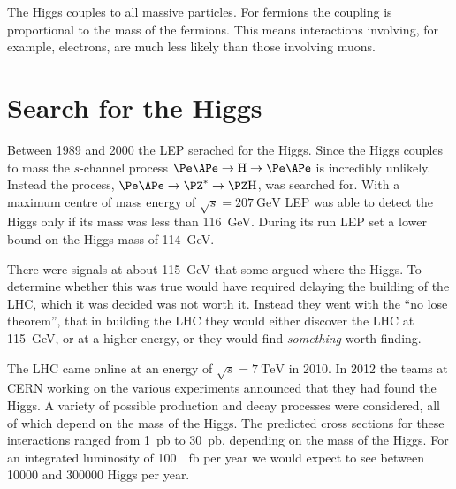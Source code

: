 \documentclass[fleqn]{NotesClass}
\newcommand{\PH}{\ensuremath{\mathrm{H}}}
\begin{document}
    The Higgs couples to all massive particles.
    For fermions the coupling is proportional to the mass of the fermions.
    This means interactions involving, for example, electrons, are much less likely than those involving muons.
    
    \section{Search for the Higgs}
    Between 1989 and 2000 the LEP serached for the Higgs.
    Since the Higgs couples to mass the \(s\)-channel process \(\Pe\APe \to \PH \to \Pe\APe\) is incredibly unlikely.
    Instead the  process, \(\Pe\APe \to \PZ^* \to \PZ\PH\), was searched for.
    With a maximum centre of mass energy of \(\sqrt{s} = \qty{207}{\giga\electronvolt}\) LEP was able to detect the Higgs only if its mass was less than \qty{116}{\giga\electronvolt}.
    During its run LEP set a lower bound on the Higgs mass of \qty{114}{\giga\electronvolt}.
    
    There were signals at about \qty{115}{\giga\electronvolt} that some argued where the Higgs.
    To determine whether this was true would have required delaying the building of the LHC, which it was decided was not worth it.
    Instead they went with the \enquote{no lose theorem}, that in building the LHC they would either discover the LHC at \qty{115}{\giga\electronvolt}, or at a higher energy, or they would find \emph{something} worth finding.
    
    The LHC came online at an energy of \(\sqrt{s} = \qty{7}{\tera\electronvolt}\) in 2010.
    In 2012 the teams at CERN working on the various experiments announced that they had found the Higgs.
    A variety of possible production and decay processes were considered, all of which depend on the mass of the Higgs.
    The predicted cross sections for these interactions ranged from \qty{1}{\pico\barn} to \qty{30}{\pico\barn}, depending on the mass of the Higgs.
    For an integrated luminosity of \qty{100}{\per\femto\barn} per year we would expect to see between \num{10000} and \num{300000} Higgs per year.
    
\end{document}
